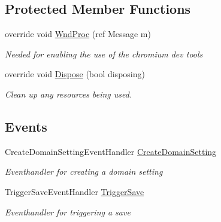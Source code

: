 \subsection*{Protected Member Functions}
\begin{DoxyCompactItemize}
\item 
override void \hyperlink{class_web_analyzer_1_1_u_i_1_1_edit_domain_setting_form_ae7d7082d04e4b1b0ef23fd1f6eb9a5c4}{Wnd\+Proc} (ref Message m)
\begin{DoxyCompactList}\small\item\em Needed for enabling the use of the chromium dev tools \end{DoxyCompactList}\item 
override void \hyperlink{class_web_analyzer_1_1_u_i_1_1_edit_domain_setting_form_a70d59a8078b0476fb0256f5e3f71cc39}{Dispose} (bool disposing)
\begin{DoxyCompactList}\small\item\em Clean up any resources being used. \end{DoxyCompactList}\end{DoxyCompactItemize}
\subsection*{Events}
\begin{DoxyCompactItemize}
\item 
Create\+Domain\+Setting\+Event\+Handler \hyperlink{class_web_analyzer_1_1_u_i_1_1_edit_domain_setting_form_a15f150af99974a02e7df872db755b121}{Create\+Domain\+Setting}
\begin{DoxyCompactList}\small\item\em Eventhandler for creating a domain setting \end{DoxyCompactList}\item 
Trigger\+Save\+Event\+Handler \hyperlink{class_web_analyzer_1_1_u_i_1_1_edit_domain_setting_form_a1ddda08125c245cc97c50557b40f5fa2}{Trigger\+Save}
\begin{DoxyCompactList}\small\item\em Eventhandler for triggering a save \end{DoxyCompactList}\end{DoxyCompactItemize}

